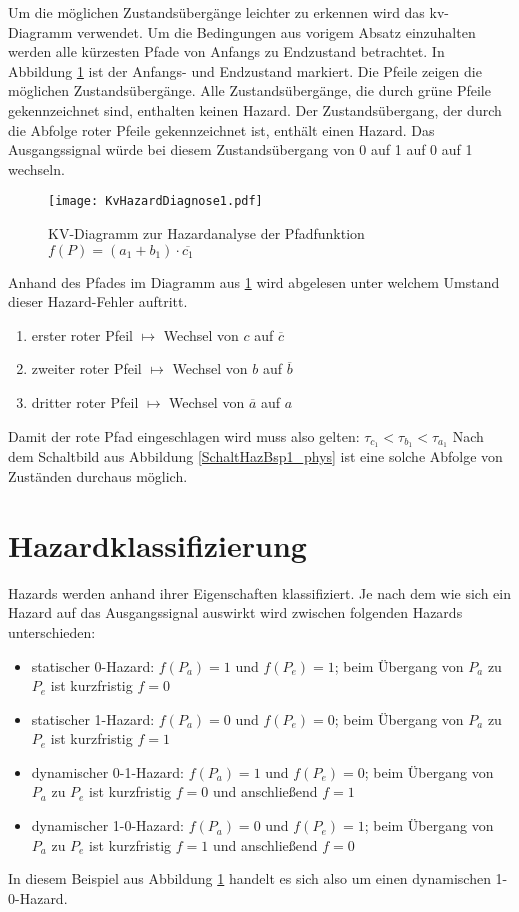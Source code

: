 Um die möglichen Zustandsübergänge leichter zu erkennen wird das {\sc kv}-Diagramm verwendet. Um die Bedingungen aus vorigem Absatz einzuhalten werden alle kürzesten Pfade von Anfangs zu Endzustand betrachtet. In Abbildung \ref{KvHazDiag1} ist der Anfangs- und Endzustand markiert. Die Pfeile zeigen die möglichen Zustandsübergänge. Alle Zustandsübergänge, die durch grüne Pfeile gekennzeichnet sind, enthalten keinen Hazard. Der Zustandsübergang, der durch die Abfolge roter Pfeile gekennzeichnet ist, enthält einen Hazard. Das Ausgangssignal würde bei diesem Zustandsübergang von 0 auf 1 auf 0 auf 1 wechseln.
\begin{figure}[htp]
	\centering
	\texttt{[image: KvHazardDiagnose1.pdf]}
	\caption{KV-Diagramm zur Hazardanalyse der Pfadfunktion $f(P) = (a_1 + b_1) \cdot \overline{c_1}$}
	\label{KvHazDiag1}
\end{figure}

Anhand des Pfades im Diagramm aus \ref{KvHazDiag1} wird abgelesen unter welchem Umstand dieser Hazard-Fehler auftritt.
\begin{enumerate}
  \item erster roter Pfeil $\mapsto$ Wechsel von $c$ auf $\overline{c}$
  \item zweiter roter Pfeil $\mapsto$ Wechsel von $b$ auf $\overline{b}$ 
  \item dritter roter Pfeil $\mapsto$ Wechsel von $\overline{a}$ auf $a$
\end{enumerate}
Damit der rote Pfad eingeschlagen wird muss also gelten: $\tau_{c_1} < \tau_{b_1} < \tau_{a_1}$
Nach dem Schaltbild aus Abbildung \ref{SchaltHazBsp1_phys} ist eine solche Abfolge von Zuständen durchaus möglich.

\section{Hazardklassifizierung}
Hazards werden anhand ihrer Eigenschaften klassifiziert. Je nach dem wie sich ein Hazard auf das Ausgangssignal auswirkt wird zwischen folgenden Hazards unterschieden:
\begin{itemize}
  \item statischer 0-Hazard: $f(P_a) = 1$ und $f(P_e) = 1$; beim Übergang von $P_a$ zu $P_e$ ist kurzfristig $f = 0$
  \item statischer 1-Hazard: $f(P_a) = 0$ und $f(P_e) = 0$; beim Übergang von $P_a$ zu $P_e$ ist kurzfristig $f = 1$
  \item dynamischer 0-1-Hazard: $f(P_a) = 1$ und $f(P_e) = 0$; beim Übergang von $P_a$ zu $P_e$ ist kurzfristig $f = 0$ und anschließend $f = 1$
  \item dynamischer 1-0-Hazard: $f(P_a) = 0$ und $f(P_e) = 1$; beim Übergang von $P_a$ zu $P_e$ ist kurzfristig $f = 1$ und anschließend $f = 0$
\end{itemize}
In diesem Beispiel aus Abbildung \ref{KvHazDiag1} handelt es sich also um einen dynamischen 1-0-Hazard.

